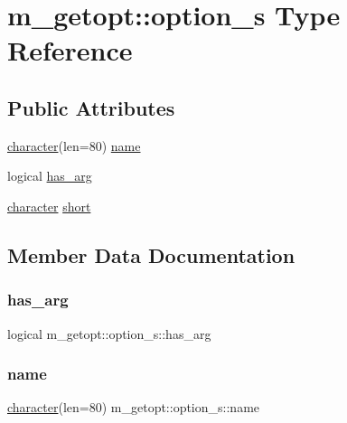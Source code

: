 \hypertarget{structm__getopt_1_1option__s}{}\section{m\+\_\+getopt\+:\+:option\+\_\+s Type Reference}
\label{structm__getopt_1_1option__s}
\subsection*{Public Attributes}
\begin{DoxyCompactItemize}
\item 
\hyperlink{option__stopwatch_83_8txt_abd4b21fbbd175834027b5224bfe97e66}{character}(len=80) \hyperlink{structm__getopt_1_1option__s_add3050f859164e78b98c04738b4ffb98}{name}
\item 
logical \hyperlink{structm__getopt_1_1option__s_a0d4f42e7ed6f85906d5e8a3600ac26dc}{has\+\_\+arg}
\item 
\hyperlink{option__stopwatch_83_8txt_abd4b21fbbd175834027b5224bfe97e66}{character} \hyperlink{structm__getopt_1_1option__s_a427aa0a11a8f872eed789f0dd6f54459}{short}
\end{DoxyCompactItemize}


\subsection{Member Data Documentation}
\mbox{\label{structm__getopt_1_1option__s_a0d4f42e7ed6f85906d5e8a3600ac26dc}} 
\subsubsection{\texorpdfstring{has\+\_\+arg}{has\_arg}}
{\footnotesize\ttfamily logical m\+\_\+getopt\+::option\+\_\+s\+::has\+\_\+arg}

\mbox{\label{structm__getopt_1_1option__s_add3050f859164e78b98c04738b4ffb98}} 
\subsubsection{\texorpdfstring{name}{name}}
{\footnotesize\ttfamily \hyperlink{option__stopwatch_83_8txt_abd4b21fbbd175834027b5224bfe97e66}{character}(len=80) m\+\_\+getopt\+::option\+\_\+s\+::name}

